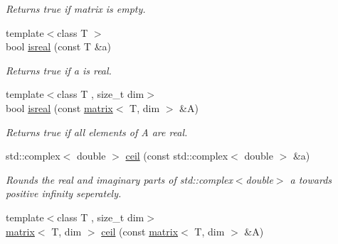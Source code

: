 \begin{DoxyCompactItemize}
\begin{DoxyCompactList}\small\item\em Returns true if matrix is empty. \end{DoxyCompactList}\item 
\hypertarget{namespacekeycpp_a81a8c955cdbeb60181f6bf7d6553ac53}{{\footnotesize template$<$class T $>$ }\\bool \hyperlink{namespacekeycpp_a81a8c955cdbeb60181f6bf7d6553ac53}{isreal} (const T \&a)}\label{namespacekeycpp_a81a8c955cdbeb60181f6bf7d6553ac53}

\begin{DoxyCompactList}\small\item\em Returns true if a is real. \end{DoxyCompactList}\item 
\hypertarget{namespacekeycpp_af1342fad8b0d8f26c4acc9a65b7ec2dd}{{\footnotesize template$<$class T , size\-\_\-t dim$>$ }\\bool \hyperlink{namespacekeycpp_af1342fad8b0d8f26c4acc9a65b7ec2dd}{isreal} (const \hyperlink{classkeycpp_1_1matrix}{matrix}$<$ T, dim $>$ \&A)}\label{namespacekeycpp_af1342fad8b0d8f26c4acc9a65b7ec2dd}

\begin{DoxyCompactList}\small\item\em Returns true if all elements of A are real. \end{DoxyCompactList}\item 
\hypertarget{namespacekeycpp_a005c1190f7087fb1d2545c38c080fd1a}{std\-::complex$<$ double $>$ \hyperlink{namespacekeycpp_a005c1190f7087fb1d2545c38c080fd1a}{ceil} (const std\-::complex$<$ double $>$ \&a)}\label{namespacekeycpp_a005c1190f7087fb1d2545c38c080fd1a}

\begin{DoxyCompactList}\small\item\em Rounds the real and imaginary parts of std\-::complex$<$double$>$ a towards positive infinity seperately. \end{DoxyCompactList}\item 
\hypertarget{namespacekeycpp_a6f75eb747c57c3e5ff91323f65a02b5f}{{\footnotesize template$<$class T , size\-\_\-t dim$>$ }\\\hyperlink{classkeycpp_1_1matrix}{matrix}$<$ T, dim $>$ \hyperlink{namespacekeycpp_a6f75eb747c57c3e5ff91323f65a02b5f}{ceil} (const \hyperlink{classkeycpp_1_1matrix}{matrix}$<$ T, dim $>$ \&A)}\label{namespacekeycpp_a6f75eb747c57c3e5ff91323f65a02b5f}


\end{DoxyCompactItemize}
